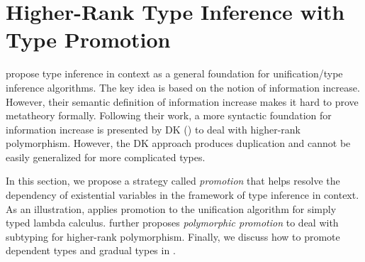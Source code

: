 \chapter{Higher-Rank Type Inference with Type Promotion}
\label{chap:Promotion}

\cite{gundry2010type} propose type inference in context as a general foundation
for unification/type inference algorithms. The key idea is based on the notion
of information increase. However, their semantic definition of information
increase makes it hard to prove metatheory formally. Following their work, a
more syntactic foundation for information increase is presented by DK
(\cite{DK}) to deal with higher-rank polymorphism. However, the DK approach
produces duplication and cannot be easily generalized for more complicated
types.

In this section, we propose a strategy called \textit{promotion} that helps
resolve the dependency of existential variables in the framework of type
inference in context. As an illustration,  applies promotion
to the unification algorithm for simply typed lambda calculus.
 further proposes \textit{polymorphic promotion} to deal
with subtyping for higher-rank polymorphism. Finally, we discuss how to promote
dependent types and gradual types in .







